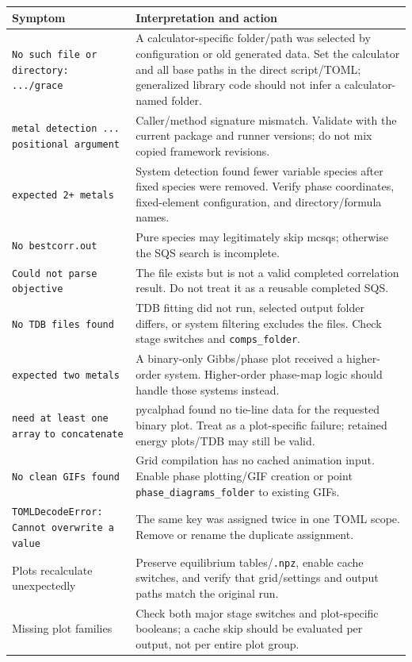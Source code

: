 \documentclass[11pt,letterpaper]{article}
\newcommand{\file}[1]{\nolinkurl{#1}}
\newcommand{\setting}[1]{\nolinkurl{#1}}
\begin{document}
\begin{longtable}{p{}p{}}
\toprule
Symptom & Interpretation and action \\
\midrule
\endhead
\file{No such file or directory: .../grace} & A calculator-specific folder/path was selected by configuration or old generated data. Set the calculator and all base paths in the direct script/TOML; generalized library code should not infer a calculator-named folder. \\
\file{metal detection ... positional argument} & Caller/method signature mismatch. Validate with the current package and runner versions; do not mix copied framework revisions. \\
\file{expected 2+ metals} & System detection found fewer variable species after fixed species were removed. Verify phase coordinates, fixed-element configuration, and directory/formula names. \\
\file{No bestcorr.out} & Pure species may legitimately skip mcsqs; otherwise the SQS search is incomplete. \\
\file{Could not parse objective} & The file exists but is not a valid completed correlation result. Do not treat it as a reusable completed SQS. \\
\file{No TDB files found} & TDB fitting did not run, selected output folder differs, or system filtering excludes the files. Check stage switches and \setting{comps_folder}. \\
\file{expected two metals} & A binary-only Gibbs/phase plot received a higher-order system. Higher-order phase-map logic should handle those systems instead. \\
\file{need at least one array}\newline
\file{to concatenate} & pycalphad found no tie-line data for the requested binary plot. Treat as a plot-specific failure; retained energy plots/TDB may still be valid. \\
\file{No clean GIFs found} & Grid compilation has no cached animation input. Enable phase plotting/GIF creation or point \setting{phase_diagrams_folder} to existing GIFs. \\
\file{TOMLDecodeError: Cannot overwrite a value} & The same key was assigned twice in one TOML scope. Remove or rename the duplicate assignment. \\
Plots recalculate unexpectedly & Preserve equilibrium tables/\file{.npz}, enable cache switches, and verify that grid/settings and output paths match the original run. \\
Missing plot families & Check both major stage switches and plot-specific booleans; a cache skip should be evaluated per output, not per entire plot group. \\
\bottomrule
\end{longtable}
\end{document}
